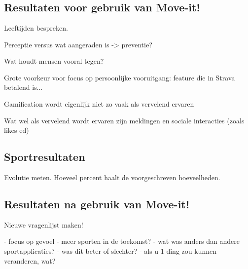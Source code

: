 \chapter{}%
\label{ch:analyse}

\section{Resultaten voor gebruik van Move-it!}

Leeftijden bespreken.

Perceptie versus wat aangeraden is -> preventie?

Wat houdt mensen vooral tegen?

Grote voorkeur voor focus op persoonlijke vooruitgang: feature die in Strava betalend is...

Gamification wordt eigenlijk niet zo vaak als vervelend ervaren

Wat wel als vervelend wordt ervaren zijn meldingen en sociale interacties (zoals likes ed)

\section{Sportresultaten}

Evolutie meten. Hoeveel percent haalt de voorgeschreven hoeveelheden.

\section{Resultaten na gebruik van Move-it!}

Nieuwe vragenlijst maken!

- focus op gevoel
- meer sporten in de toekomst?
- wat was anders dan andere sportapplicaties?
    - was dit beter of slechter?
- als u 1 ding zou kunnen veranderen, wat?